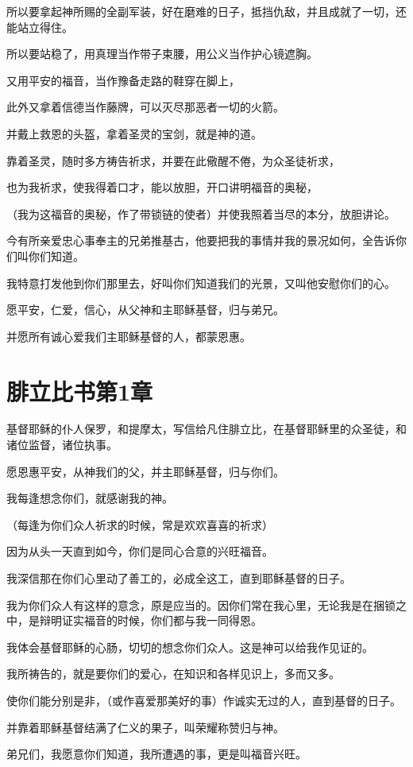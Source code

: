 \documentclass[12pt,oneside]{book}
\begin{document}
所以要拿起神所赐的全副军装，好在磨难的日子，抵挡仇敌，并且成就了一切，还能站立得住。

所以要站稳了，用真理当作带子束腰，用公义当作护心镜遮胸。

又用平安的福音，当作豫备走路的鞋穿在脚上，

此外又拿着信德当作藤牌，可以灭尽那恶者一切的火箭。

并戴上救恩的头盔，拿着圣灵的宝剑，就是神的道。

靠着圣灵，随时多方祷告祈求，并要在此儆醒不倦，为众圣徒祈求，

也为我祈求，使我得着口才，能以放胆，开口讲明福音的奥秘，

（我为这福音的奥秘，作了带锁链的使者）并使我照着当尽的本分，放胆讲论。

今有所亲爱忠心事奉主的兄弟推基古，他要把我的事情并我的景况如何，全告诉你们叫你们知道。

我特意打发他到你们那里去，好叫你们知道我们的光景，又叫他安慰你们的心。

愿平安，仁爱，信心，从父神和主耶稣基督，归与弟兄。

并愿所有诚心爱我们主耶稣基督的人，都蒙恩惠。

\chapter{腓立比书第1章}
基督耶稣的仆人保罗，和提摩太，写信给凡住腓立比，在基督耶稣里的众圣徒，和诸位监督，诸位执事。

愿恩惠平安，从神我们的父，并主耶稣基督，归与你们。

我每逢想念你们，就感谢我的神。

（每逢为你们众人祈求的时候，常是欢欢喜喜的祈求）

因为从头一天直到如今，你们是同心合意的兴旺福音。

我深信那在你们心里动了善工的，必成全这工，直到耶稣基督的日子。

我为你们众人有这样的意念，原是应当的。因你们常在我心里，无论我是在捆锁之中，是辩明证实福音的时候，你们都与我一同得恩。

我体会基督耶稣的心肠，切切的想念你们众人。这是神可以给我作见证的。

我所祷告的，就是要你们的爱心，在知识和各样见识上，多而又多。

使你们能分别是非，（或作喜爱那美好的事）作诚实无过的人，直到基督的日子。

并靠着耶稣基督结满了仁义的果子，叫荣耀称赞归与神。

弟兄们，我愿意你们知道，我所遭遇的事，更是叫福音兴旺。
\end{document}
